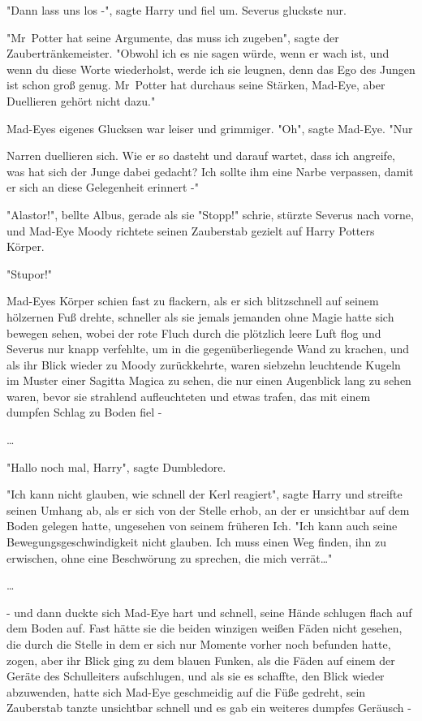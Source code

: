 {"Dann lass uns los -", sagte Harry und fiel um. Severus gluckste nur.

"Mr~Potter hat seine Argumente, das muss ich zugeben", sagte der Zaubertränkemeister. "Obwohl ich es nie sagen würde, wenn er wach ist, und wenn du diese Worte wiederholst, werde ich sie leugnen, denn das Ego des Jungen ist schon groß genug. Mr~Potter hat durchaus seine Stärken, Mad-Eye, aber Duellieren gehört nicht dazu."

Mad-Eyes eigenes Glucksen war leiser und grimmiger. "Oh", sagte Mad-Eye. "Nur

Narren duellieren sich. Wie er so dasteht und darauf wartet, dass ich angreife, was hat sich der Junge dabei gedacht? Ich sollte ihm eine Narbe verpassen, damit er sich an diese Gelegenheit erinnert -"

"Alastor!", bellte Albus, gerade als sie "Stopp!" schrie, stürzte Severus nach vorne, und Mad-Eye Moody richtete seinen Zauberstab gezielt auf Harry Potters Körper.

"Stupor!"

Mad-Eyes Körper schien fast zu flackern, als er sich blitzschnell auf seinem hölzernen Fuß drehte, schneller als sie jemals jemanden ohne Magie hatte sich bewegen sehen, wobei der rote Fluch durch die plötzlich leere Luft flog und Severus nur knapp verfehlte, um in die gegenüberliegende Wand zu krachen, und als ihr Blick wieder zu Moody zurückkehrte, waren siebzehn leuchtende Kugeln im Muster einer Sagitta Magica zu sehen, die nur einen Augenblick lang zu sehen waren, bevor sie strahlend aufleuchteten und etwas trafen, das mit einem dumpfen Schlag zu Boden fiel -

…

"Hallo noch mal, Harry", sagte Dumbledore.

"Ich kann nicht glauben, wie schnell der Kerl reagiert", sagte Harry und streifte seinen Umhang ab, als er sich von der Stelle erhob, an der er unsichtbar auf dem Boden gelegen hatte, ungesehen von seinem früheren Ich. "Ich kann auch seine Bewegungsgeschwindigkeit nicht glauben. Ich muss einen Weg finden, ihn zu erwischen, ohne eine Beschwörung zu sprechen, die mich verrät…"

…

- und dann duckte sich Mad-Eye hart und schnell, seine Hände schlugen flach auf dem Boden auf. Fast hätte sie die beiden winzigen weißen Fäden nicht gesehen, die durch die Stelle in dem er sich nur Momente vorher noch befunden hatte, zogen, aber ihr Blick ging zu dem blauen Funken, als die Fäden auf einem der Geräte des Schulleiters aufschlugen, und als sie es schaffte, den Blick wieder abzuwenden, hatte sich Mad-Eye geschmeidig auf die Füße gedreht, sein Zauberstab tanzte unsichtbar schnell und es gab ein weiteres dumpfes Geräusch -

}
